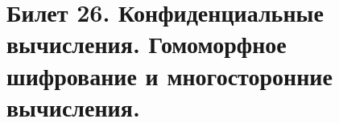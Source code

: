 \newpage
\section {Билет 26. Конфиденциальные вычисления. Гомоморфное шифрование и многосторонние вычисления.}